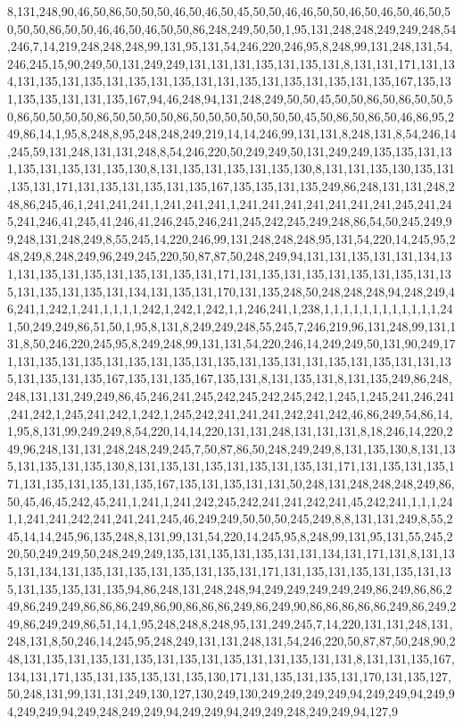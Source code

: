 8,131,248,90,46,50,86,50,50,50,46,50,46,50,45,50,50,46,46,50,50,46,50,46,50,46,50,50,50,50,86,50,50,46,46,50,46,50,50,86,248,249,50,50,1,95,131,248,248,249,249,248,54,246,7,14,219,248,248,248,99,131,95,131,54,246,220,246,95,8,248,99,131,248,131,54,246,245,15,90,249,50,131,249,249,131,131,131,135,131,135,131,8,131,131,171,131,134,131,135,131,135,131,135,131,135,131,131,135,131,135,131,135,131,135,167,135,131,135,135,131,131,135,167,94,46,248,94,131,248,249,50,50,45,50,50,86,50,86,50,50,50,86,50,50,50,50,86,50,50,50,50,86,50,50,50,50,50,50,50,45,50,86,50,86,50,46,86,95,249,86,14,1,95,8,248,8,95,248,248,249,219,14,14,246,99,131,131,8,248,131,8,54,246,14,245,59,131,248,131,131,248,8,54,246,220,50,249,249,50,131,249,249,135,135,131,131,135,131,135,131,135,130,8,131,135,131,135,131,135,130,8,131,131,135,130,135,131,135,131,171,131,135,131,135,131,135,167,135,135,131,135,249,86,248,131,131,248,248,86,245,46,1,241,241,241,1,241,241,241,1,241,241,241,241,241,241,241,245,241,245,241,246,41,245,41,246,41,246,245,246,241,245,242,245,249,248,86,54,50,245,249,99,248,131,248,249,8,55,245,14,220,246,99,131,248,248,248,95,131,54,220,14,245,95,248,249,8,248,249,96,249,245,220,50,87,87,50,248,249,94,131,131,135,131,131,134,131,131,135,131,135,131,135,131,135,131,171,131,135,131,135,131,135,131,135,131,135,131,135,131,135,131,134,131,135,131,170,131,135,248,50,248,248,248,94,248,249,46,241,1,242,1,241,1,1,1,1,242,1,242,1,242,1,1,246,241,1,238,1,1,1,1,1,1,1,1,1,1,1,1,241,50,249,249,86,51,50,1,95,8,131,8,249,249,248,55,245,7,246,219,96,131,248,99,131,131,8,50,246,220,245,95,8,249,248,99,131,131,54,220,246,14,249,249,50,131,90,249,171,131,135,131,135,131,135,131,135,131,135,131,135,131,131,135,131,135,131,131,135,131,135,131,135,167,135,131,135,167,135,131,8,131,135,131,8,131,135,249,86,248,248,131,131,249,249,86,45,246,241,245,242,245,242,245,242,1,245,1,245,241,246,241,241,242,1,245,241,242,1,242,1,245,242,241,241,241,242,241,242,46,86,249,54,86,14,1,95,8,131,99,249,249,8,54,220,14,14,220,131,131,248,131,131,131,8,18,246,14,220,249,96,248,131,131,248,248,249,245,7,50,87,86,50,248,249,249,8,131,135,130,8,131,135,131,135,131,135,130,8,131,135,131,135,131,135,131,135,131,171,131,135,131,135,171,131,135,131,135,131,135,167,135,131,135,131,131,50,248,131,248,248,248,249,86,50,45,46,45,242,45,241,1,241,1,241,242,245,242,241,241,242,241,45,242,241,1,1,1,241,1,241,241,242,241,241,241,245,46,249,249,50,50,50,245,249,8,8,131,131,249,8,55,245,14,14,245,96,135,248,8,131,99,131,54,220,14,245,95,8,248,99,131,95,131,55,245,220,50,249,249,50,248,249,249,135,131,135,131,135,131,131,134,131,171,131,8,131,135,131,134,131,135,131,135,131,135,131,135,131,171,131,135,131,135,131,135,131,135,131,135,135,131,135,94,86,248,131,248,248,94,249,249,249,249,249,86,249,86,86,249,86,249,249,86,86,86,249,86,90,86,86,86,249,86,249,90,86,86,86,86,86,249,86,249,249,86,249,249,86,51,14,1,95,248,248,8,248,95,131,249,245,7,14,220,131,131,248,131,248,131,8,50,246,14,245,95,248,249,131,131,248,131,54,246,220,50,87,87,50,248,90,248,131,135,131,135,131,135,131,135,131,135,131,131,135,131,131,8,131,131,135,167,134,131,171,135,131,135,135,131,135,130,171,131,135,131,135,131,170,131,135,127,50,248,131,99,131,131,249,130,127,130,249,130,249,249,249,249,94,249,249,94,249,94,249,249,94,249,248,249,249,94,249,249,94,249,249,248,249,249,94,127,9